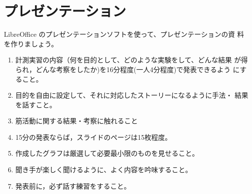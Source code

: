 \documentclass{jarticle}
\begin{document}
\section{プレゼンテーション}
LibreOffice のプレゼンテーションソフトを使って、プレゼンテーションの資
料を作りましょう。
\begin{enumerate}
\item 計測実習の内容（何を目的として、どのような実験をして、どんな結果
  が得られ，どんな考察をしたか)を16分程度(一人4分程度)で発表できるよう
  にすること。
\item 目的を自由に設定して、それに対応したストーリーになるように手法・
  結果を話すこと。
\item 筋活動に関する結果・考察に触れること
\item 15分の発表ならば，スライドのページは15枚程度。
\item 作成したグラフは厳選して必要最小限のものを見せること。
\item 聞き手が楽しく聞けるように、よく内容を吟味すること。
\item 発表前に，必ず話す練習をすること。
\end{enumerate}
\end{document}
